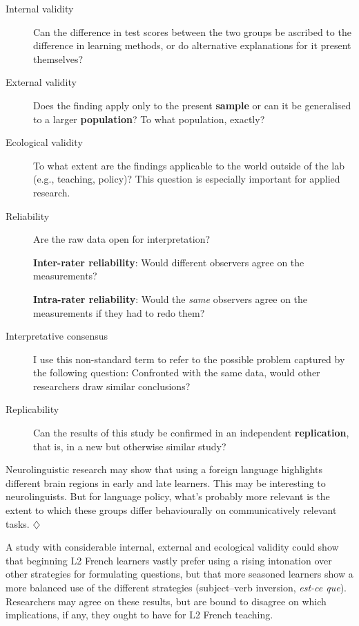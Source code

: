 \documentclass[a4paper]{tufte-book}\usepackage[]{graphicx}\usepackage[]{xcolor}
\newcommand{\term}[1]{\textbf{#1}}
\newcommand*{\parend}[1][$\diamondsuit$]{%
  \unskip\nobreak\hspace{1em plus 1fill}$\diamondsuit$%
}
\begin{document}
\begin{description}
 \item[Internal validity]
 Can the difference in test scores between the two groups
 be ascribed to the difference in learning methods,
 or do alternative explanations for it present themselves?

 \item[External validity]
 Does the finding apply only to the present \term{sample}
 or can it be generalised to a larger \term{population}?
 To what population, exactly?

 \item[Ecological validity]
 To what extent are the findings applicable
 to the world outside of the lab
 (e.g., teaching, policy)?
 This question is especially important for applied research.
 
 \item[Reliability]
  Are the raw data open for interpretation?
 
 \term{Inter-rater reliability}: Would different observers agree on the measurements?
 
 \term{Intra-rater reliability}: Would the \emph{same} observers agree on the measurements if they had to redo them?
 
  \item[Interpretative consensus]
  I use this non-standard term to refer to the possible problem captured
  by the following question:
 Confronted with the same data, would other researchers draw similar conclusions?

 \item[Replicability]
 Can the results of this study be confirmed
 in an independent \term{replication},
 that is, in a new but otherwise similar study?
\end{description}

  Neurolinguistic research may show that using a foreign language highlights
  different brain regions in early and late learners.
  This may be interesting to neurolinguists.
  But for language policy, what's probably more relevant is the extent to which
  these groups differ behaviourally on communicatively relevant tasks.
\parend

A study with considerable internal, external and ecological validity could show
that beginning L2 French learners vastly prefer using a rising intonation 
over other strategies
for formulating questions, but that more seasoned learners show a more balanced
use of the different strategies (subject--verb inversion, \textit{est-ce que}). 
Researchers may agree on these results, 
but are bound to disagree on which implications, 
if any, they ought to have for L2 French teaching. 
\end{document}
